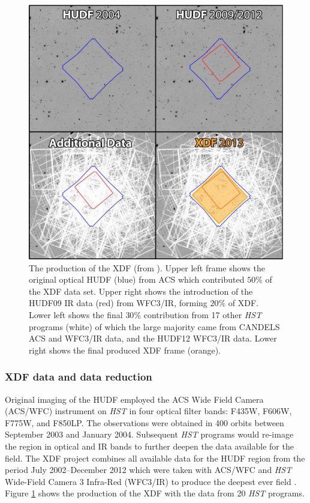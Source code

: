 \documentclass[12pt, twocolumn, nofootinbib]{revtex4-1}    %
\begin{document}
\begin{figure}
\includegraphics[width=\linewidth]{introduction/xdf_frame.jpg}
\caption[Hubble eXtreme Deep Field]{The production of the XDF (from \cite{2013ApJS..209....6I}). Upper left frame shows the original optical HUDF (blue) from ACS which contributed $50\%$ of the XDF data set. Upper right shows the introduction of the HUDF09 IR data (red) from WFC3/IR, forming $20\%$ of XDF. Lower left shows the final $30\%$ contribution from 17 other \textit{HST} programs (white) of which the large majority came from CANDELS ACS and WFC3/IR data, and the HUDF12 WFC3/IR data. Lower right shows the final produced XDF frame (orange).}
\label{fig:xdf_frame}
\end{figure}

\vspace{2ex} %
\subsubsection{XDF data and data reduction}
\noindent
Original imaging of the HUDF \citep{2006AJ....132.1729B} employed the ACS Wide Field Camera (ACS/WFC) instrument on \textit{HST} in four optical filter bands: F435W, F606W, F775W, and F850LP. The observations were obtained in 400 orbits between September 2003 and January 2004. Subsequent \textit{HST} programs would re-image the region in optical and IR bands to further deepen the data available for the field. The XDF project combines all available data for the HUDF region from the period July 2002--December 2012 which were taken with ACS/WFC and \textit{HST} Wide-Field Camera 3 Infra-Red (WFC3/IR) to produce the deepest ever field \citep{2013ApJS..209....6I}. Figure \ref{fig:xdf_frame} shows the production of the XDF with the data from 20 \textit{HST} programs.
\end{document}
